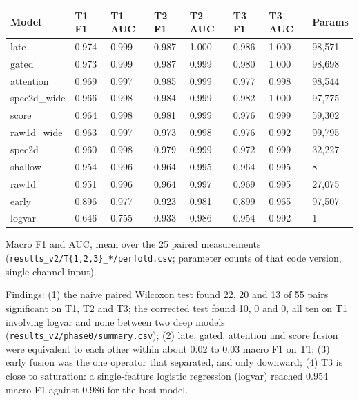 \documentclass[11pt,a4paper]{article}
\newcounter{none} %
\begin{document}
{\def\LTcaptype{none} %
\begin{longtable}[]{@{}llllllll@{}}
\toprule\noalign{}
Model & T1 F1 & T1 AUC & T2 F1 & T2 AUC & T3 F1 & T3 AUC & Params \\
\midrule\noalign{}
\endhead
\bottomrule\noalign{}
\endlastfoot
late & 0.974 & 0.999 & 0.987 & 1.000 & 0.986 & 1.000 & 98,571 \\
gated & 0.973 & 0.999 & 0.987 & 0.999 & 0.980 & 1.000 & 98,698 \\
attention & 0.969 & 0.997 & 0.985 & 0.999 & 0.977 & 0.998 & 98,544 \\
spec2d\_wide & 0.966 & 0.998 & 0.984 & 0.999 & 0.982 & 1.000 & 97,775 \\
score & 0.964 & 0.998 & 0.981 & 0.999 & 0.976 & 0.999 & 59,302 \\
raw1d\_wide & 0.963 & 0.997 & 0.973 & 0.998 & 0.976 & 0.992 & 99,795 \\
spec2d & 0.960 & 0.998 & 0.979 & 0.999 & 0.972 & 0.999 & 32,227 \\
shallow & 0.954 & 0.996 & 0.964 & 0.995 & 0.964 & 0.995 & 8 \\
raw1d & 0.951 & 0.996 & 0.964 & 0.997 & 0.969 & 0.995 & 27,075 \\
early & 0.896 & 0.977 & 0.923 & 0.981 & 0.899 & 0.965 & 97,507 \\
logvar & 0.646 & 0.755 & 0.933 & 0.986 & 0.954 & 0.992 & 1 \\
\end{longtable}
}

Macro F1 and AUC, mean over the 25 paired measurements (\nolinkurl{results_v2/T{1,2,3}_*/perfold.csv};
parameter counts of that code version, single-channel input).

Findings: (1) the naive paired Wilcoxon test found 22, 20 and 13 of 55 pairs significant
on T1, T2 and T3; the corrected test found 10, 0 and 0, all ten on T1 involving logvar
and none between two deep models (\nolinkurl{results_v2/phase0/summary.csv}); (2) late, gated,
attention and score fusion were equivalent to each other within about 0.02 to 0.03
macro F1 on T1; (3) early fusion was the one operator that separated, and only
downward; (4) T3 is close to saturation: a single-feature logistic regression (logvar)
reached 0.954 macro F1 against 0.986 for the best model.
\end{document}
